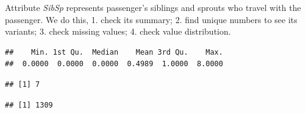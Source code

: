 \documentclass[
]{book}
\newenvironment{Shaded}{\begin{snugshade}}{\end{snugshade}}
\newcommand{\CommentTok}[1]{\textcolor[rgb]{0.56,0.35,0.01}{\textit{#1}}}
\newcommand{\KeywordTok}[1]{\textcolor[rgb]{0.13,0.29,0.53}{\textbf{#1}}}
\newcommand{\NormalTok}[1]{#1}
\newcommand{\OperatorTok}[1]{\textcolor[rgb]{0.81,0.36,0.00}{\textbf{#1}}}
\newcommand{\StringTok}[1]{\textcolor[rgb]{0.31,0.60,0.02}{#1}}
\begin{document}
Attribute \emph{SibSp} represents passenger's siblings and sprouts who travel with the passenger. We do this, 1. check its summary; 2. find unique numbers to see its variants; 3. check missing values; 4. check value distribution.

\begin{Shaded}
\end{Shaded}

\begin{verbatim}
##    Min. 1st Qu.  Median    Mean 3rd Qu.    Max. 
##  0.0000  0.0000  0.0000  0.4989  1.0000  8.0000
\end{verbatim}

\begin{Shaded}
\end{Shaded}

\begin{verbatim}
## [1] 7
\end{verbatim}

\begin{Shaded}
\end{Shaded}

\begin{verbatim}
## [1] 1309
\end{verbatim}

\begin{Shaded}
\end{Shaded}
\end{document}
